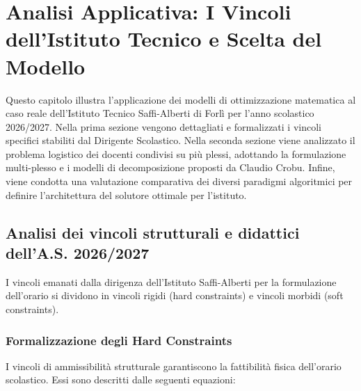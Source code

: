 \chapter{Analisi Applicativa: I Vincoli dell'Istituto Tecnico e Scelta del Modello}
\label{chap:capitolo3}

Questo capitolo illustra l'applicazione dei modelli di ottimizzazione matematica al caso reale dell'Istituto Tecnico Saffi-Alberti di Forlì per l'anno scolastico 2026/2027. Nella prima sezione vengono dettagliati e formalizzati i vincoli specifici stabiliti dal Dirigente Scolastico. Nella seconda sezione viene analizzato il problema logistico dei docenti condivisi su più plessi, adottando la formulazione multi-plesso e i modelli di decomposizione proposti da Claudio Crobu. Infine, viene condotta una valutazione comparativa dei diversi paradigmi algoritmici per definire l'architettura del solutore ottimale per l'istituto.

\section{Analisi dei vincoli strutturali e didattici dell'A.S. 2026/2027}
\label{sec:analisi-vincoli-saffi}

I vincoli emanati dalla dirigenza dell'Istituto Saffi-Alberti per la formulazione dell'orario si dividono in vincoli rigidi (hard constraints) e vincoli morbidi (soft constraints).

\subsection{Formalizzazione degli Hard Constraints}
\label{subsec:hard-saffi}

I vincoli di ammissibilità strutturale garantiscono la fattibilità fisica dell'orario scolastico. Essi sono descritti dalle seguenti equazioni:


